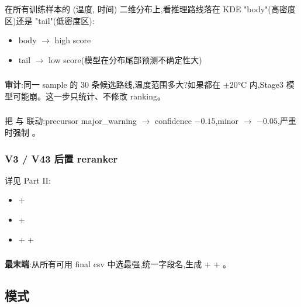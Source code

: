 在所有训练样本的 (温度, 时间) 二维分布上,看推理路线落在 KDE "body"(高密度区)还是 "tail"(低密度区):
\begin{itemize}
    \item body $\to$ high score
    \item tail $\to$ low score(模型在分布尾部预测不确定性大)
\end{itemize}

\subsubsection{}

\textbf{审计}:同一 sample 的 30 条候选路线,温度范围多大?如果都在 $\pm 20$°C 内,Stage3 模型可能崩。这一步只统计、不修改 ranking。

\subsubsection{}

把  与  联动:precursor major\_warning $\to$ confidence $-0.15$,minor $\to$ $-0.05$,严重时强制 。

\subsubsection{V3 / V43 后置 reranker}

详见 Part II:
\begin{itemize}
    \item {} + 
    \item {} + 
    \item {} +  + 
\end{itemize}

\subsubsection{}

\textbf{最末端}:从所有可用 final csv 中选最强,统一字段名,生成  +  + 。

\subsection{ 模式}


